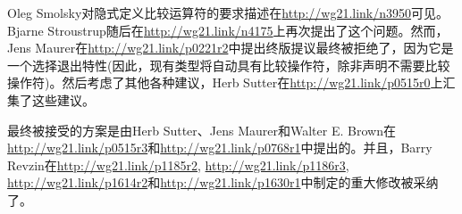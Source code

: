 Oleg Smolsky对隐式定义比较运算符的要求描述在\url{http://wg21.link/n3950}可见。Bjarne Stroustrup随后在\url{http://wg21.link/n4175}上再次提出了这个问题。然而，Jens Maurer在\url{http://wg21.link/p0221r2}中提出终版提议最终被拒绝了，因为它是一个选择退出特性(因此，现有类型将自动具有比较操作符，除非声明不需要比较操作符)。然后考虑了其他各种建议，Herb Sutter在\url{http://wg21.link/p0515r0}上汇集了这些建议。

最终被接受的方案是由Herb Sutter、Jens Maurer和Walter E. Brown在\url{http://wg21.link/p0515r3}和\url{http://wg21.link/p0768r1}中提出的。并且，Barry Revzin在\url{http://wg21.link/p1185r2}, \url{http://wg21.link/p1186r3}, \url{http://wg21.link/p1614r2}和\url{http://wg21.link/p1630r1}中制定的重大修改被采纳了。